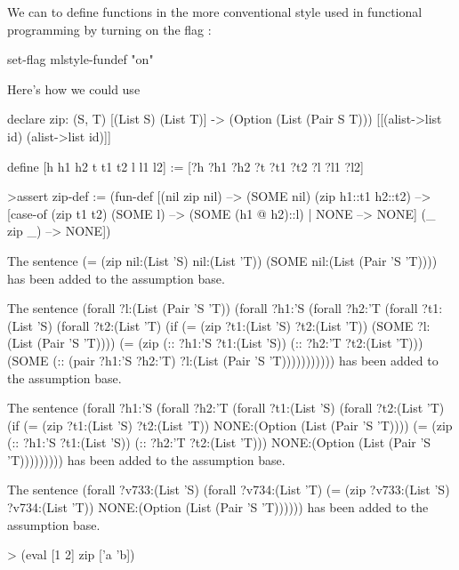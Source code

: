 We can  to define functions in the more conventional style used in functional programming
by turning on the flag :
\begin{tcAthena}
set-flag mlstyle-fundef "on" 
\end{tcAthena}
Here's how we could use 
\begin{tcAthena}
declare zip: (S, T) [(List S) (List T)] -> (Option (List (Pair S T)))
                        [[(alist->list id) (alist->list id)]]

define [h h1 h2 t t1 t2 l l1 l2] := [?h ?h1 ?h2 ?t ?t1 ?t2 ?l ?l1 ?l2]

>assert zip-def := 
   (fun-def [(nil zip nil) --> (SOME nil)
             (zip h1::t1 h2::t2) --> 
                [case-of (zip t1 t2) 
                   (SOME l) --> (SOME (h1 @ h2)::l)
	         | NONE --> NONE]
            (_ zip _) --> NONE])

The sentence 
(= (zip nil:(List 'S)
        nil:(List 'T))
   (SOME nil:(List (Pair 'S 'T))))
has been added to the assumption base.

The sentence 
(forall ?l:(List (Pair 'S 'T))
  (forall ?h1:'S
    (forall ?h2:'T
      (forall ?t1:(List 'S)
        (forall ?t2:(List 'T)
          (if (= (zip ?t1:(List 'S)
                      ?t2:(List 'T))
                 (SOME ?l:(List (Pair 'S 'T))))
              (= (zip (:: ?h1:'S
                          ?t1:(List 'S))
                      (:: ?h2:'T
                          ?t2:(List 'T)))
                 (SOME (:: (pair ?h1:'S ?h2:'T)
                           ?l:(List (Pair 'S 'T)))))))))))
has been added to the assumption base.

The sentence 
(forall ?h1:'S
  (forall ?h2:'T
    (forall ?t1:(List 'S)
      (forall ?t2:(List 'T)
        (if (= (zip ?t1:(List 'S)
                    ?t2:(List 'T))
               NONE:(Option (List (Pair 'S 'T))))
            (= (zip (:: ?h1:'S
                        ?t1:(List 'S))
                    (:: ?h2:'T
                        ?t2:(List 'T)))
               NONE:(Option (List (Pair 'S 'T)))))))))
has been added to the assumption base.

The sentence 
(forall ?v733:(List 'S)
  (forall ?v734:(List 'T)
    (= (zip ?v733:(List 'S)
            ?v734:(List 'T))
       NONE:(Option (List (Pair 'S 'T))))))
has been added to the assumption base.

> (eval [1 2] zip ['a 'b])

\end{tcAthena}


